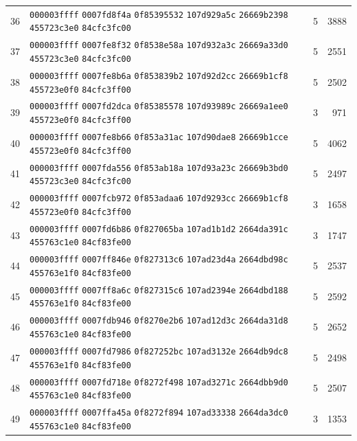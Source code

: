 \begin{longtable}{@{}r p{12cm} r r@{}}
36 & \texttt{000003ffff} \texttt{0007fd8f4a} \texttt{0f85395532} \texttt{107d929a5c} \texttt{26669b2398} \texttt{455723c3e0} \texttt{84cfc3fc00} & 5 & 3888 \\
37 & \texttt{000003ffff} \texttt{0007fe8f32} \texttt{0f8538e58a} \texttt{107d932a3c} \texttt{26669a33d0} \texttt{455723c3e0} \texttt{84cfc3fc00} & 5 & 2551 \\
38 & \texttt{000003ffff} \texttt{0007fe8b6a} \texttt{0f853839b2} \texttt{107d92d2cc} \texttt{26669b1cf8} \texttt{455723e0f0} \texttt{84cfc3ff00} & 5 & 2502 \\
39 & \texttt{000003ffff} \texttt{0007fd2dca} \texttt{0f85385578} \texttt{107d93989c} \texttt{26669a1ee0} \texttt{455723e0f0} \texttt{84cfc3ff00} & 3 & 971 \\
40 & \texttt{000003ffff} \texttt{0007fe8b66} \texttt{0f853a31ac} \texttt{107d90dae8} \texttt{26669b1cce} \texttt{455723e0f0} \texttt{84cfc3ff00} & 5 & 4062 \\
41 & \texttt{000003ffff} \texttt{0007fda556} \texttt{0f853ab18a} \texttt{107d93a23c} \texttt{26669b3bd0} \texttt{455723c3e0} \texttt{84cfc3fc00} & 5 & 2497 \\
42 & \texttt{000003ffff} \texttt{0007fcb972} \texttt{0f853adaa6} \texttt{107d9293cc} \texttt{26669b1cf8} \texttt{455723e0f0} \texttt{84cfc3ff00} & 3 & 1658 \\
43 & \texttt{000003ffff} \texttt{0007fd6b86} \texttt{0f827065ba} \texttt{107ad1b1d2} \texttt{2664da391c} \texttt{455763c1e0} \texttt{84cf83fe00} & 3 & 1747 \\
44 & \texttt{000003ffff} \texttt{0007ff846e} \texttt{0f827313c6} \texttt{107ad23d4a} \texttt{2664dbd98c} \texttt{455763e1f0} \texttt{84cf83fe00} & 5 & 2537 \\
45 & \texttt{000003ffff} \texttt{0007ff8a6c} \texttt{0f827315c6} \texttt{107ad2394e} \texttt{2664dbd188} \texttt{455763e1f0} \texttt{84cf83fe00} & 5 & 2592 \\
46 & \texttt{000003ffff} \texttt{0007fdb946} \texttt{0f8270e2b6} \texttt{107ad12d3c} \texttt{2664da31d8} \texttt{455763c1e0} \texttt{84cf83fe00} & 5 & 2652 \\
47 & \texttt{000003ffff} \texttt{0007fd7986} \texttt{0f827252bc} \texttt{107ad3132e} \texttt{2664db9dc8} \texttt{455763e1f0} \texttt{84cf83fe00} & 5 & 2498 \\
48 & \texttt{000003ffff} \texttt{0007fd718e} \texttt{0f8272f498} \texttt{107ad3271c} \texttt{2664dbb9d0} \texttt{455763c1e0} \texttt{84cf83fe00} & 5 & 2507 \\
49 & \texttt{000003ffff} \texttt{0007ffa45a} \texttt{0f8272f894} \texttt{107ad33338} \texttt{2664da3dc0} \texttt{455763c1e0} \texttt{84cf83fe00} & 3 & 1353 \\

\end{longtable}

